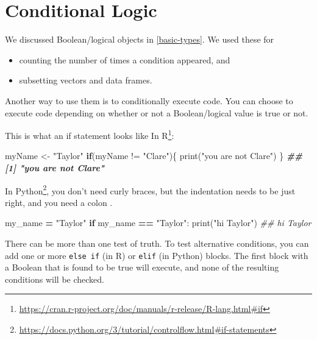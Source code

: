 \documentclass[
  12pt,
  krantz2]{krantz}
\makeatletter
\newenvironment{Shaded}{\begin{snugshade}}{\end{snugshade}}
\newcommand{\BuiltInTok}[1]{#1}
\newcommand{\CommentTok}[1]{\textcolor[rgb]{0.37,0.37,0.37}{\textit{#1}}}
\newcommand{\ControlFlowTok}[1]{\textcolor[rgb]{0.27,0.27,0.27}{\textbf{#1}}}
\newcommand{\DocumentationTok}[1]{\textcolor[rgb]{0.37,0.37,0.37}{\textbf{\textit{#1}}}}
\newcommand{\FunctionTok}[1]{\textcolor[rgb]{0,0,0}{#1}}
\newcommand{\NormalTok}[1]{#1}
\newcommand{\OperatorTok}[1]{\textcolor[rgb]{0.43,0.43,0.43}{\textbf{#1}}}
\newcommand{\OtherTok}[1]{\textcolor[rgb]{0.37,0.37,0.37}{#1}}
\newcommand{\SpecialCharTok}[1]{\textcolor[rgb]{0,0,0}{#1}}
\newcommand{\StringTok}[1]{\textcolor[rgb]{0.5,0.5,0.5}{#1}}
\providecommand{\tightlist}{%
  \setlength{\itemsep}{0pt}\setlength{\parskip}{0pt}}
\renewcommand{\href}[2]{#2\footnote{\url{#1}}}
\newenvironment{kframe}{%
\medskip{}
\setlength{\fboxsep}{.8em}
 \def\at@end@of@kframe{}%
 \ifinner\ifhmode%
  \def\at@end@of@kframe{\end{minipage}}%
  \begin{minipage}{\columnwidth}%
 \fi\fi%
 \def\FrameCommand##1{\hskip\@totalleftmargin \hskip-\fboxsep
 \colorbox{shadecolor}{##1}\hskip-\fboxsep
     \hskip-\linewidth \hskip-\@totalleftmargin \hskip\columnwidth}%
 \MakeFramed {\advance\hsize-\width
   \@totalleftmargin\z@ \linewidth\hsize
   \@setminipage}}%
 {\par\unskip\endMakeFramed%
 \at@end@of@kframe}
\renewenvironment{Shaded}{\begin{kframe}}{\end{kframe}}
\makeatother
\begin{document}
\hypertarget{conditional-logic}{%
\section{Conditional Logic}\label{conditional-logic}}

We discussed Boolean/logical objects in \ref{basic-types}. We used these for

\begin{itemize}
\tightlist
\item
  counting the number of times a condition appeared, and
\item
  subsetting vectors and data frames.
\end{itemize}

Another way to use them is to conditionally execute code. You can choose to execute code depending on whether or not a Boolean/logical value is true or not.

This is what an \href{https://cran.r-project.org/doc/manuals/r-release/R-lang.html\#if}{if statement looks like In R}:

\begin{Shaded}
\begin{Highlighting}[]
\NormalTok{myName }\OtherTok{\textless{}{-}} \StringTok{"Taylor"}
\ControlFlowTok{if}\NormalTok{(myName }\SpecialCharTok{!=} \StringTok{"Clare"}\NormalTok{)\{}
    \FunctionTok{print}\NormalTok{(}\StringTok{"you are not Clare"}\NormalTok{)}
\NormalTok{\}}
\DocumentationTok{\#\# [1] "you are not Clare"}
\end{Highlighting}
\end{Shaded}

\href{https://docs.python.org/3/tutorial/controlflow.html\#if-statements}{In Python}, you don't need curly braces, but the indentation needs to be just right, and you need a colon \citep{Lutz13}.

\begin{Shaded}
\begin{Highlighting}[]
\NormalTok{my\_name }\OperatorTok{=} \StringTok{"Taylor"}
\ControlFlowTok{if}\NormalTok{ my\_name }\OperatorTok{==} \StringTok{"Taylor"}\NormalTok{:}
    \BuiltInTok{print}\NormalTok{(}\StringTok{"hi Taylor"}\NormalTok{)}
\CommentTok{\#\# hi Taylor}
\end{Highlighting}
\end{Shaded}

There can be more than one test of truth. To test alternative conditions, you can add one or more \texttt{else\ if} (in R) or \texttt{elif} (in Python) blocks. The first block with a Boolean that is found to be true will execute, and none of the resulting conditions will be checked.
\end{document}
